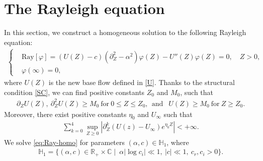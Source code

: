 \documentclass[reqno,11pt]{amsart}
\numberwithin{equation}{section}
\numberwithin{equation}{section}
\theoremstyle{plain}
\begin{document}
\section{The Rayleigh equation}\label{sec-Ray}

In this section, we construct a homogeneous solution to the following  Rayleigh equation:
\begin{align}\label{eq:Ray-homo}
	\left\{
	\begin{aligned}
		&\mathrm{Ray}[\varphi]=(U(Z)-c)(\partial_Z^2-\alpha^2)\varphi (Z)-U''(Z)\varphi (Z)=0,\quad Z>0,\\ &\varphi(\infty)=0,
	\end{aligned}
	\right.	
\end{align}
where $U(Z)$ is the new base flow defined in \eqref{U}. Thanks to the structural condition \eqref{SC}, we can find positive constants $Z_0$ and $M_0$, such that
\begin{align}\label{eq:Hyper-U}
	\partial_ZU(Z),~ \partial_Z^2U(Z)\geq M_0 ~\mbox{for}~0\leq Z\leq Z_0,~~\text{and }~~U(Z)\geq M_0 ~\mbox{for}~Z\geq Z_0.
\end{align}
Moreover, there exist positive constants $\eta_0$ and $U_\infty$ such that
\begin{align}\label{eq:Hyper-u-v}
\sum_{k=0}^{4}\sup_{Z\geq0}\left|\partial_Z^k(U(z)-U_{\infty})e^{\eta_0 Z}\right|<+\infty.
\end{align}
We solve \eqref{eq:Ray-homo} for parameters $(\alpha,c)\in \mathbb{H}_1$, where
\begin{align}\label{def-H1}
	\mathbb{H}_1=\{(\alpha,c)\in \mathbb{R}_{+}\times\mathbb{C}\mid~\alpha|\log c_i|\ll1,~|c|\ll 1,~ c_r, c_i>0\}.
\end{align}


\end{document}
